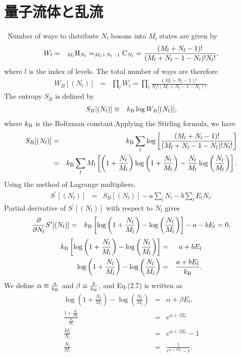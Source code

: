 \documentclass[12pt,a4paper]{jbook}
\newcommand{\kb} {k_{\rm B}}				           %
\begin{document}
\section{量子流体と乱流}
\ Number of ways to distribute $N_l$ bosons into $M_l$ states are given by
\begin{eqnarray}
W_l & = & _{M_l} {\rm H}_{N_l} = _{M_l + N_l - 1} {\rm C}_{N_l} =  \frac{(M_l+N_l-1)!}{(M_l+N_l-1-N_l)!N_l!}
,
\end{eqnarray}
where $l$ is the index of levels.
The total number of ways are therefore
\begin{eqnarray}
W_B[(N_l)] & = & \prod_l W_l = \prod_l \frac{(M_l+N_l-1)!}{N_l!(M_l+N_l-1-N_l)!}.
\end{eqnarray}
The entropy $S_B$ is defined by
\begin{eqnarray}
S_B[(N_l)] & \equiv & \kb \log W_B[(N_l)],
\end{eqnarray}
where $\kb$ is the Boltzman constant.Applying the Stirling formula, we have
\begin{eqnarray}
S_B[(N_l)] & = & \kb \sum_l \log
\left[
\frac{(M_l+N_l-1)!}{(M_l+N_l-1-N_l)!N_l!}
\right] \nonumber
\\
& = & \kb \sum_l M_l
\left[
\left(1 + \frac{N_l}{M_l}\right)
\log \left(1 + \frac{N_l}{M_l}\right)
- \frac{N_l}{M_l} \log \left( \frac{N_l}{M_l}\right)
\right].
\end{eqnarray}
Using the method of Lagrange multipliers,
\begin{eqnarray}
S^\prime [(N_l )] & = & S_B[( N_l )] - a \sum_l N_l - b \sum_l E_l N_l.
\end{eqnarray}
Partial derivative of $S^\prime [(N_l )]$ with respect to $N_l$ gives
\begin{eqnarray}
\frac{\partial}{\partial N_l}S^\prime [(N_l )] & = &
\kb
\left[
\log \left(1 + \frac{N_l}{M_l} \right) - \log \left( \frac{N_l}{M_l} \right)
\right] - a - b E_l = 0,
\end{eqnarray}
\begin{eqnarray}
\kb
\left[
\log \left(1 + \frac{N_l}{M_l} \right) - \log \left( \frac{N_l}{M_l} \right)
\right] & = & a + b E_l  \nonumber
\\
\log \left(1 + \frac{N_l}{M_l} \right) - \log \left( \frac{N_l}{M_l} \right)
& = & \frac{a + b E_l}{\kb}.
\end{eqnarray}
We define $\alpha \equiv \frac{a}{\kb}$ and $\beta \equiv \frac{b}{\kb}$, and Eq.(2.7) is written as
\begin{eqnarray}
\log \left(1 + \frac{N_l}{M_l} \right) - \log \left( \frac{N_l}{M_l} \right)
& = & \alpha + \beta E_l,
\\
\frac{1+\frac{N_l}{M_l}}{\frac{N_l}{M_l}} & = & e^{\alpha + \beta E_l} \nonumber
\\
\frac{M_l}{N_l} & = & e^{\alpha + \beta E_l} - 1 \nonumber
\\
\frac{N_l}{M_l} & = & \frac{1}{e^{\alpha + \beta E_l} -1}.
\end{eqnarray}
\end{document}
